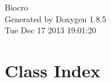 \documentclass[twoside]{book}
\newcommand{\clearemptydoublepage}{%
  \newpage{\pagestyle{empty}\cleardoublepage}%
}
\begin{document}
\hypersetup{pageanchor=false}
\begin{titlepage}
\vspace*{7cm}
\begin{center}%
{\Large Biocro }\\
\vspace*{1cm}
{\large Generated by Doxygen 1.8.5}\\
\vspace*{0.5cm}
{\small Tue Dec 17 2013 19:01:20}\\
\end{center}
\end{titlepage}
\clearemptydoublepage
\tableofcontents
\clearemptydoublepage
{}
\hypersetup{pageanchor=true}

\chapter{Class Index}

\end{document}
